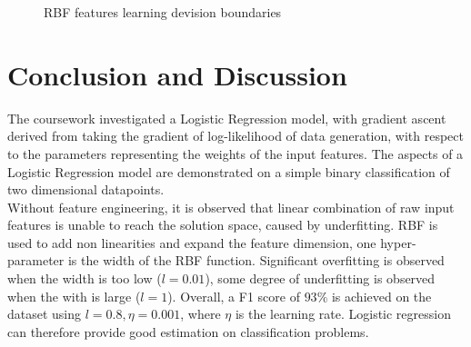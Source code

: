 \documentclass[journal]{IEEEtran}
\begin{document}
\begin{figure}[htbp]
\centering     %
{}
\caption{RBF features learning devision boundaries}
\label{fig:rbf}
\end{figure}

\section{Conclusion and Discussion}
The coursework investigated a Logistic Regression model, with gradient ascent derived from taking the gradient of log-likelihood of data generation, with respect to the parameters representing the weights of the input features. The aspects of a Logistic Regression model are demonstrated on a simple binary classification of two dimensional datapoints.\\ 
Without feature engineering, it is observed that linear combination of raw input features is unable to reach the solution space, caused by underfitting. RBF is used to add non linearities and expand the feature dimension, one hyper-parameter is the width of the RBF function. Significant overfitting is observed when the width is too low ($l=0.01$), some degree of underfitting is observed when the with is large ($l=1$). Overall, a F1 score of $93\%$ is achieved on the dataset using $l=0.8, \eta=0.001$, where $\eta$ is the learning rate. Logistic regression can therefore provide good estimation on classification problems.
\end{document}
